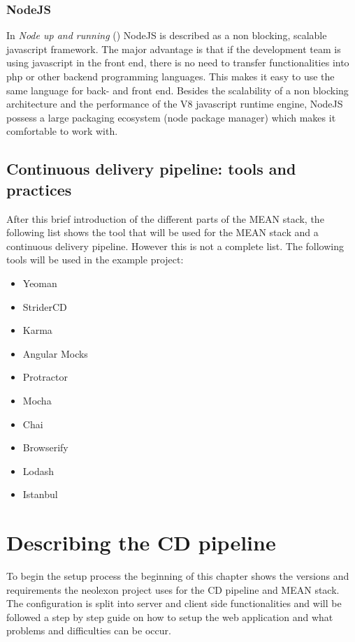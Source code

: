 \subsubsection{NodeJS}
In \textit{Node up and running} (\cite{hughes2012node}) NodeJS is described as a non blocking, scalable javascript framework. The major advantage is that
if the development team is using javascript in the front end, there is no need to transfer functionalities into php or other backend programming languages.
This makes it easy to use the same language for back- and front end. Besides the scalability of a non blocking architecture and the performance
of the V8 javascript runtime engine, NodeJS possess a large packaging ecosystem (node package manager) which makes it comfortable to work with.

\subsection{Continuous delivery pipeline: tools and practices}
After this brief introduction of the different parts of the MEAN stack, the following list shows the tool that will be used for the MEAN stack and a
continuous delivery pipeline. However this is not a complete list. The following tools will be used in the example project:

\begin{itemize}
  \item Yeoman
  \item StriderCD
  \item Karma
  \item Angular Mocks
  \item Protractor
  \item Mocha
  \item Chai
  \item Browserify
  \item Lodash
  \item Istanbul
\end{itemize}

\section{Describing the CD pipeline}
\label{section:Describing CD Pipeline}
To begin the setup process the beginning of this chapter shows the versions and requirements the neolexon project uses for the CD pipeline and MEAN stack.
The configuration is split into server and client side functionalities and will be followed a step by step guide on how to setup the web application
and what problems and difficulties can be occur.

